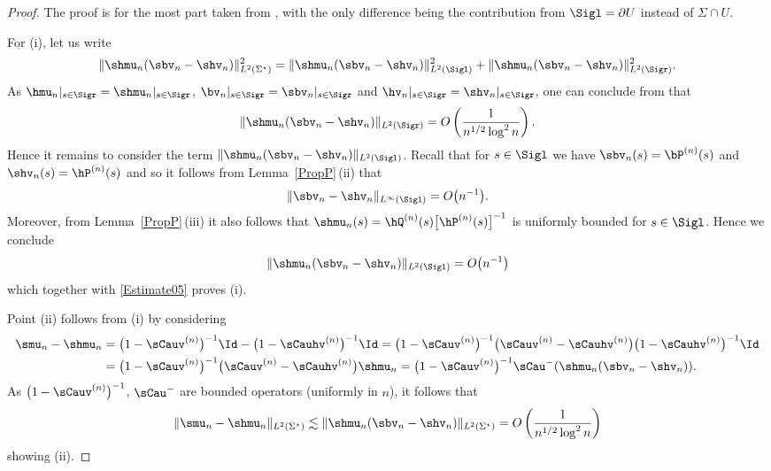 \begin{proof}
The proof is for the most part taken from \cite[Proposition~B.2]{CD}, with the only difference being the contribution from $\Sigl =\partial U$ instead of $\Sigma \cap U$.

For (i), let us write
\begin{align}\label{IntDecomp}
 \Vert \shmu_n (\sbv_n - \shv_n) \Vert_{L^2(\Sigma^\star)}^2 = \Vert \shmu_n (\sbv_n - \shv_n) \Vert_{L^2(\Sigl)}^2 + \Vert \shmu_n (\sbv_n - \shv_n) \Vert_{L^2(\Sigr)}^2.
\end{align}
As $\hmu_n|_{s\in \Sigr} = \shmu_n|_{s\in\Sigr}$, $\bv_n|_{s\in \Sigr} = \sbv_n|_{s\in\Sigr}$ and $\hv_n|_{s\in \Sigr} = \shv_n|_{s\in\Sigr}$, one can conclude from \cite[equation~5.1]{CD} that
\begin{align} \label{Estimate05}
 \Vert \shmu_n (\sbv_n - \shv_n) \Vert_{L^2(\Sigr)} = O\left(\frac{1}{n^{1/2}\log^2 n}\right).
\end{align}
Hence it remains to consider the term $\Vert \shmu_n (\sbv_n - \shv_n) \Vert_{L^2(\Sigl)}$. Recall that for $s \in \Sigl$ we have $\sbv_n(s) = \bP^{(n)}(s)$ and $\shv_n(s) = \hP^{(n)}(s)$ and so it follows from Lemma~\ref{PropP}\,(ii) that
\begin{align}\label{jumpsComparison}
 \Vert \sbv_n - \shv_n \Vert_{L^\infty(\Sigl)} = O\big(n^{-1}\big).
\end{align}
Moreover, from Lemma~\ref{PropP}\,(iii) it also follows that $\shmu_n(s) = \hQ^{(n)}(s) \big[\hP^{(n)}(s)\big]^{-1}$ is uniformly bounded for $s \in \Sigl$. Hence we conclude
\begin{align*}
 \Vert \shmu_n (\sbv_n - \shv_n) \Vert_{L^2(\Sigl)} = O\bigl(n^{-1}\bigr)
\end{align*}
which together with \eqref{Estimate05} proves (i).

Point (ii) follows from (i) by considering
\begin{align*}
 \smu_n - \shmu_n &= \big(1-\sCauv^{(n)}\big)^{-1} \Id - \big(1-\sCauhv^{(n)}\big)^{-1}\Id
= \big(1-\sCauv^{(n)}\big)^{-1}\big(\sCauv^{(n)}-\sCauhv^{(n)}\big) \big(1-\sCauhv^{(n)}\big)^{-1}\Id
 \\
 &= \big(1-\sCauv^{(n)}\big)^{-1}\big(\sCauv^{(n)}-\sCauhv^{(n)}\big)\shmu_n= \big(1-\sCauv^{(n)}\big)^{-1}\sCau^-(\shmu_n(\sbv_n-\shv_n)).
\end{align*}
As $\big(1-\sCauv^{(n)}\big)^{-1}$, $\sCau^-$ are bounded operators (uniformly in $n$), it follows that{\samepage
\begin{align*}
 \Vert \smu_n - \shmu_n \Vert_{L^2(\Sigma^\star)} \lesssim \Vert \shmu_n(\sbv_n-\shv_n) \Vert_{L^2(\Sigma^\star)} = O\left(\frac{1}{n^{1/2}\log^2 n}\right)
\end{align*}
showing (ii).}


\end{proof}
